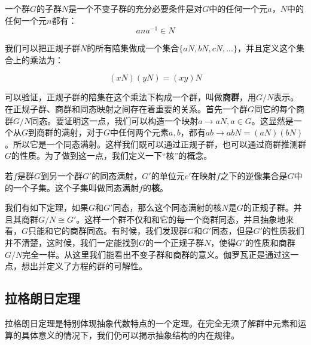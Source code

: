 \documentclass[b5paper]{ctexart}
\begin{document}
\begin{theorem}
一个群$G$的子群$N$是一个不变子群的充分必要条件是对$G$中的任何一个元$a$，$N$中的任何一个元$n$都有：
\[
ana^{-1} \in N
\]
\end{theorem}

我们可以把正规子群$N$的所有陪集做成一个集合$\{aN, bN, cN, ...\}$，并且定义这个集合上的乘法为：

\[
(xN)(yN) = (xy)N
\]

可以验证，正规子群的陪集在这个乘法下构成一个群，叫做\textbf{商群}，用$G/N$表示。在正规子群、商群和同态映射之间存在着重要的关系。首先一个群$G$同它的每个商群$G/N$同态。要证明这一点，我们可以构造一个映射$a \to aN, a \in G$。这显然是一个从$G$到商群的满射，对于$G$中任何两个元素$a, b$，都有$ab \to abN = (aN)(bN)$。所以它是一个同态满射。这样我们既可以通过正规子群，也可以通过商群推测群$G$的性质。为了做到这一点，我们定义一下“核”的概念。

\begin{definition}
若$f$是群$G$到另一个群$G'$的同态满射，$G'$的单位元$e'$在映射$f$之下的逆像集合是$G$中的一个子集。这个子集叫做同态满射$f$的\textbf{核}。
\end{definition}

我们有如下定理，如果$G$和$G'$同态，那么这个同态满射的核$N$是$G$的正规子群。并且其商群$G/N \cong G'$。这样一个群不仅和和它的每一个商群同态，并且抽象地来看，$G$只能和它的商群同态。有时候，我们发现群$G$和$G'$同态，但是$G'$的性质我们并不清楚，这时候，我们一定能找到$G$的一个正规子群$N$，使得$G'$的性质和商群$G/N$完全一样。从这里我们能看出不变子群和商群的意义。伽罗瓦正是通过这一点，想出并定义了方程的群的可解性。

\begin{Exercise}
\end{Exercise}

\subsection{拉格朗日定理}

拉格朗日定理是特别体现抽象代数特点的一个定理。在完全无须了解群中元素和运算的具体意义的情况下，我们仍可以揭示抽象结构的内在规律。
\end{document}
